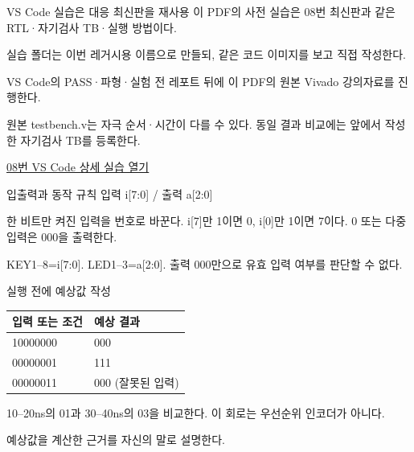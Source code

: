 \begin{frame}{VS Code 실습은 대응 최신판을 재사용}\relax
\small
이 PDF의 사전 실습은 08번 최신판과 같은 RTL·자기검사 TB·실행 방법이다.\par\vspace{0.22cm}실습 폴더는 이번 레거시용 이름으로 만들되, 같은 코드 이미지를 보고 직접 작성한다.\par\vspace{0.22cm}VS Code의 PASS·파형·실험 전 레포트 뒤에 이 PDF의 원본 Vivado 강의자료를 진행한다.\par\vspace{0.22cm}원본 testbench.v는 자극 순서·시간이 다를 수 있다. 동일 결과 비교에는 앞에서 작성한 자기검사 TB를 등록한다.\par\href{04.LAB1_08_ENCODER8TO3_VIVADO.pdf}{08번 VS Code 상세 실습 열기}
\end{frame}

\begin{frame}[label=legacy-08-sim]{입출력과 동작 규칙}\relax
\small
입력 i[7:0] / 출력 a[2:0]\par\vspace{0.22cm}한 비트만 켜진 입력을 번호로 바꾼다. i[7]만 1이면 0, i[0]만 1이면 7이다. 0 또는 다중 입력은 000을 출력한다.\par\vspace{0.22cm}KEY1–8=i[7:0]. LED1–3=a[2:0]. 출력 000만으로 유효 입력 여부를 판단할 수 없다.\par
\end{frame}

\begin{frame}{실행 전에 예상값 작성}\relax
\small
\begin{center}\renewcommand{\arraystretch}{1.45}
\begin{tabular}{l|l}
입력 또는 조건 & 예상 결과\\\hline
10000000 & 000\\
00000001 & 111\\
00000011 & 000 (잘못된 입력)\\
\end{tabular}\end{center}
10–20ns의 01과 30–40ns의 03을 비교한다. 이 회로는 우선순위 인코더가 아니다.\par\vspace{0.22cm}예상값을 계산한 근거를 자신의 말로 설명한다.\par
\end{frame}

